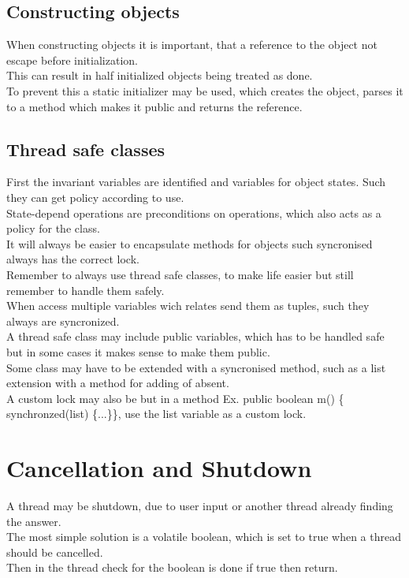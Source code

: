 \documentclass[12pt, a4paper]{article}
\begin{document}
		\subsection{Constructing objects}
			When constructing objects it is important, that a reference to the object not escape before initialization.\\
			This can result in half initialized objects being treated as done.\\
			To prevent this a static initializer may be used, which creates the object, parses it to a method which makes it public and returns the reference.
		\subsection{Thread safe classes}
			First the invariant variables are identified and variables for object states. Such they can get policy according to use.\\
			State-depend operations are preconditions on operations, which also acts as a policy for the class.\\
			It will always be easier to encapsulate methods for objects such syncronised always has the correct lock.\\
			Remember to always use thread safe classes, to make life easier but still remember to handle them safely.\\
			When access multiple variables wich relates send them as tuples, such they always are syncronized.\\
			A thread safe class may include public variables, which has to be handled safe but in some cases it makes sense to make them public.\\
			Some class may have to be extended with a syncronised method, such as a list extension with a method for adding of absent.\\
			A custom lock may also be but in a method Ex. public boolean m() \{ synchronzed(list) \{...\}\}, use the list variable as a custom lock.\\
	\section{Cancellation and Shutdown}
		A thread may be shutdown, due to user input or another thread already finding the answer.\\
		The most simple solution is a volatile boolean, which is set to true when a thread should be cancelled.\\
		Then in the thread check for the boolean is done if true then return.\\
\end{document}
